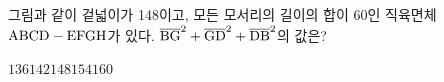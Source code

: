 그림과 같이 겉넓이가 148이고, 모든 모서리의 길이의 합이 60인 직육면체 $\mathrm{ABCD}-\mathrm{EFGH}$가 있다. $\overline{\mathrm{BG}}^2+\overline{\mathrm{GD}}^2+\overline{\mathrm{DB}}^2$의 값은?
\par\smallskip\begin{center}\resizebox{\ifdim\width>\linewidth\linewidth\else\width\fi}{!}{}\end{center}
\begin{choices32}{$136$}{$142$}{$148$}{$154$}{$160$}\end{choices32}
